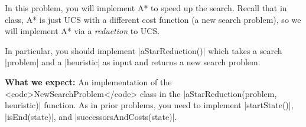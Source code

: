 \item {}

In this problem, you will implement A* to speed up the search. Recall that in class, A* is just UCS with a different cost function (a new search problem), so we will implement A* via a \textit{reduction} to UCS.

In particular, you should implement |aStarReduction()| which takes a search |problem| and a |heuristic| as input and returns a new search problem.

\textbf{What we expect: } An implementation of the <code>NewSearchProblem</code> class in the |aStarReduction(problem, heuristic)| function. As in prior problems, you need to implement |startState()|, |isEnd(state)|, and |successorsAndCosts(state)|.
  